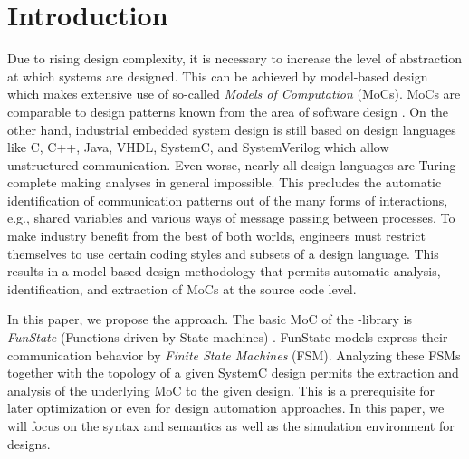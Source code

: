 
\section{Introduction}\label{sec:intro}

Due to rising design complexity, it is necessary to increase the level of abstraction at which systems are designed.
This can be achieved by model-based design which makes extensive use of so-called \emph{Models of Computation} \cite{embsft:2002} (MoCs).
MoCs are comparable to design patterns known from the area of software design \cite{gamma:1995}.
On the other hand, industrial embedded system design is still based on design languages like C, C++, Java, VHDL, SystemC, and SystemVerilog which allow unstructured communication.
Even worse, nearly all design languages are Turing complete making analyses in general impossible.
This precludes the automatic identification of communication patterns out of the many forms of interactions, e.g., shared variables and various ways of message passing between processes.
To make industry benefit from the best of both worlds, engineers must restrict themselves to use certain coding styles and subsets of a design language.
This results in a model-based design methodology that permits automatic analysis, identification, and extraction of MoCs at the source code level.



In this paper, we propose the \SysteMoC{} approach.
The basic MoC of the \SysteMoC{}-library is \emph{FunState} (Functions driven by State machines) \cite{stgzet:2001}.
FunState models express their communication behavior by \emph{Finite State Machines} (FSM).
Analyzing these FSMs together with the topology of a given SystemC design permits the extraction and analysis of the underlying MoC to the given design.
This is a prerequisite for later optimization or even for design automation approaches.
In this paper, we will focus on the \SysteMoC{} syntax and semantics as well as the simulation environment for \SysteMoC{} designs.

